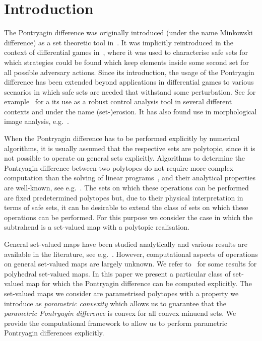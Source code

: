 \documentclass[a4paper, 12pt, twoside]{article}
\theoremstyle{definition}
\numberwithin{equation}{section}
\begin{document}

\section{Introduction}
%
The Pontryagin difference was originally introduced (under the 
name Minkowski difference) as a set theoretic tool
in~\cite{Hadwiger:1950,Hadwiger:1957}. 
%
It was implicitly reintroduced in the context of
differential games in~\cite{Pontryagin:1966}, where it was used to characterise safe sets for which strategies could be found which keep elements inside some second set for all possible adversary actions.
%
Since its introduction, the usage of the Pontryagin difference has been extended beyond applications in differential games to various scenarios in which safe sets are needed that withstand some perturbation.
%
See for example~\cite{blanchini:2007} for a its use as a robust
control analysis tool in several different contexts and under the name
(set-)erosion. It has also found use in morphological image analysis, e.g.~\cite{Haralick:1987}.
%

When the Pontryagin difference has to be performed explicitly by numerical algorithms, it is usually assumed that the respective sets are polytopic, since it is not possible to operate on general sets explicitly.
%
Algorithms to determine the Pontryagin difference between two
polytopes do not require more complex computation than the solving of
linear programs~\cite{Kolmanovsky:1998,Kerrigan:2003}, and their
analytical properties are well-known, see e.g.~\cite{blanchini:2007,Haralick:1987,Kolmanovsky:1998}.
%
The sets on which these operations can be performed are fixed
predetermined polytopes but, due to their physical interpretation in
terms of safe sets, it can be desirable to extend the class of sets on which these operations can be performed.
%
For this purpose we consider the case in which the subtrahend is a
set-valued map with a polytopic realisation.

General set-valued maps have been studied analytically and various results are available in the literature, see e.g.~\cite{Aubin:2009}.
%
However, computational aspects of operations on general set-valued
maps are largely unknown. We refer to~\cite{Finzel:2000} for some results for polyhedral set-valued maps.
%
In this paper we present a particular class of set-valued map for which the Pontryagin difference can be computed explicitly.
%
The set-valued maps we consider are parametrised polytopes with a property we introduce as \emph{parametric convexity} which allows us to guarantee that the \emph{parametric Pontryagin difference} is convex for all convex minuend sets.
%
We provide the computational framework to allow us to perform parametric Pontryagin differences explicitly.
\end{document}
